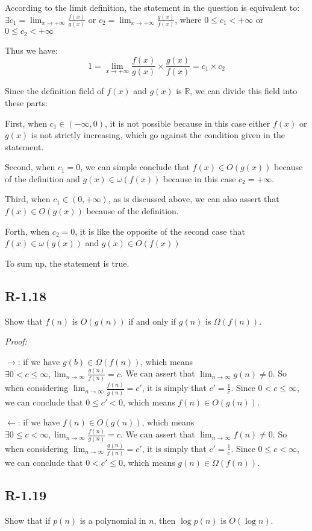 \documentclass[11pt]{article}
\begin{document}
	According to the limit definition, the statement in the question is equivalent to: $\exists c_1=\lim_{x\to+\infty} \frac{f(x)}{g(x)}$ or $c_2=\lim_{x\to+\infty}\frac{g(x)}{f(x)}$, where $0\leq c_1<+\infty$ or $0\leq c_2<+\infty$
	
	Thus we have:
	\begin{equation*}
		1=\lim_{x\to+\infty} \frac{f(x)}{g(x)} \times \frac{g(x)}{f(x)} = c_1 \times c_2
	\end{equation*}
	
	Since the definition field of $f(x)$ and $g(x)$ is $\mathbb{R}$, we can divide this field into these parts:
	
	First, when $c_1 \in (-\infty,0)$, it is not possible because in this case either $f(x)$ or $g(x)$ is not strictly increasing, which go against the condition given in the statement.
	
	Second, when $c_1 = 0$, we can simple conclude that $f(x)\in O(g(x))$ because of the definition and $g(x)\in \omega(f(x))$ because in this case $c_2 = +\infty$.
	
	Third, when $c_1 \in(0,+\infty)$, as is discussed above, we can also assert that $f(x)\in O(g(x))$ because of the definition.
	
	Forth, when $c_2 = 0$, it is like the opposite of the second case that $f(x)\in \omega(g(x))$ and $g(x)\in O(f(x))$
	
	To sum up, the statement is true.
\subsection{R-1.18}
	Show that $f(n)$ is $O(g(n))$ if and only if $g(n)$ is $\Omega(f(n))$.

	\emph{Proof:}

	$\to$: if we have $g(b)\in \Omega(f(n))$, which means $\exists 0<c\leq \infty, \lim_{n\to\infty} \frac{g(n)}{f(n)}=c$. We can assert that $\lim_{n\to\infty}g(n) \not =0$. So when considering $\lim_{n\to\infty}\frac{f(n)}{g(n)} =c'$, it is simply that $c' =\frac{1}{c}$. Since $0<c\leq \infty$, we can conclude that $0\leq c'<0$, which means $f(n)\in O(g(n))$.
	
	$\gets$: if we have $f(n)\in O(g(n))$, which means $\exists 0\leq c< \infty, \lim_{n\to\infty} \frac{f(n)}{g(n)}=c$. We can assert that $\lim_{n\to\infty}f(n) \not =0$. So when considering $\lim_{n\to\infty}\frac{g(n)}{f(n)} =c'$, it is simply that $c' =\frac{1}{c}$. Since $0\leq c< \infty$, we can conclude that $0< c'\leq0$, which means $g(n) \in \Omega(f(n))$.
\subsection{R-1.19}
	Show that if $p(n)$ is a polynomial in $n$, then $\log p(n)$ is $O(\log n)$.
\end{document}
